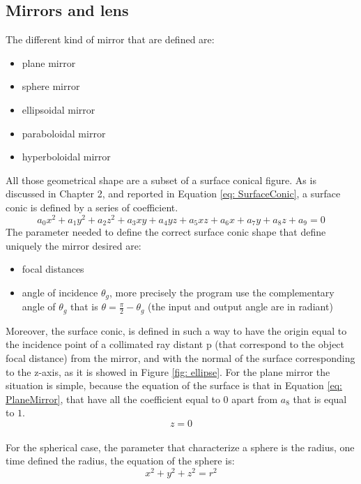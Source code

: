 \subsection{Mirrors and lens}
The different kind of mirror that are defined are:
\begin{itemize}
\item plane mirror
\item sphere mirror
\item ellipsoidal mirror
\item paraboloidal mirror
\item hyperboloidal mirror
%
\end{itemize}
All those geometrical shape are a subset of a surface conical figure. As is discussed in Chapter 2, and reported in Equation \ref{eq: SurfaceConic}, a surface conic is defined by a series of coefficient.
\begin{equation}
a_0 x^2 + a_1 y^2 + a_2 z^2 + a_3 xy + a_4 yz + a_5 xz + a_6 x + a_7 y + a_8 z + a_9 = 0 
\label{eq: SurfaceConic}
\end{equation}
%
The parameter needed to define the correct surface conic shape that define uniquely the mirror desired are:
%
\begin{itemize}
\item focal distances
\item angle of incidence $\theta_g $, more precisely the program use the complementary angle of $\theta_g $ that is $\theta = \frac{\pi}{2} - \theta_g $ (the input and output angle are in radiant)
\end{itemize}
%
Moreover, the surface conic, is defined in such a way to have the origin equal to the incidence point of a collimated ray distant p (that correspond to the object focal distance) from the mirror, and with the normal of the surface corresponding to the z-axis, as it is showed in Figure \ref{fig: ellipse}.
For the plane mirror the situation is simple, because the equation of the surface is that in Equation \ref{eq: PlaneMirror}, that have all the coefficient equal to $0 $ apart from $a_8 $ that is equal to $1 $. 
%
\begin{equation}
z = 0
\label{eq: PlaneMirror}
\end{equation}
%
\\
For the spherical case, the parameter that characterize a sphere is the radius, one time defined the radius, the equation of the sphere is:
\begin{equation}
x^2 + y^2 + z^2 = r^2
\label{eq: sphere}
\end{equation}
